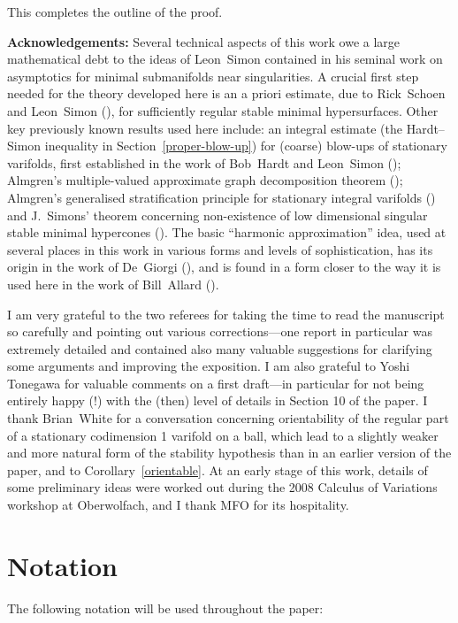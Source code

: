 \documentclass[a4paper,11pt]{amsart}
\begin{document}
This completes the outline of the proof.


\noindent
{\bf Acknowledgements:} 
Several technical aspects of this work owe a large mathematical debt to the ideas of Leon~Simon contained in his seminal work \cite{S} on asymptotics for minimal submanifolds near singularities. A crucial first step needed for the theory developed here is an a priori estimate, due to Rick~Schoen and Leon~Simon (\cite{SS}), for sufficiently regular stable minimal hypersurfaces.  Other key 
previously known results used here include: an integral estimate  (the Hardt--Simon inequality in Section~\ref{proper-blow-up}) for (coarse) blow-ups of stationary varifolds, first established in the work of Bob~Hardt and Leon~Simon (\cite{HS}); Almgren's multiple-valued approximate graph decomposition theorem (\cite{A}); Almgren's generalised stratification principle for stationary integral varifolds (\cite{A}) and J.~Simons' theorem concerning non-existence of low dimensional singular stable minimal hypercones (\cite{SJ}). The basic ``harmonic approximation''  idea, used at several places in this work in various forms and levels of sophistication, has its origin in the work of  De~Giorgi (\cite{DG}), and is found in a form closer to the way it is used here in 
the work of Bill~Allard (\cite{AW}).

 

I am very grateful to the two referees for taking the time to read the manuscript so carefully and pointing out various corrections---one report in particular was extremely detailed and contained also many valuable suggestions for clarifying some arguments and improving  the exposition. I am also grateful to Yoshi Tonegawa for valuable comments on a first draft---in particular for not being entirely happy (!) with the (then) level of details in Section 10 of the paper. I  thank Brian~White for a conversation concerning orientability of the regular part of a stationary codimension 1 varifold on a ball,  which lead to a slightly weaker and more natural form of the stability hypothesis than in an earlier version of the paper, and to Corollary~\ref{orientable}. At an early stage of this work, details of some preliminary ideas were worked out during the 2008 Calculus of Variations workshop at Oberwolfach, and I thank MFO for its hospitality.





\section{Notation}\label{notation}
The following notation will be used throughout the paper:
\end{document}
